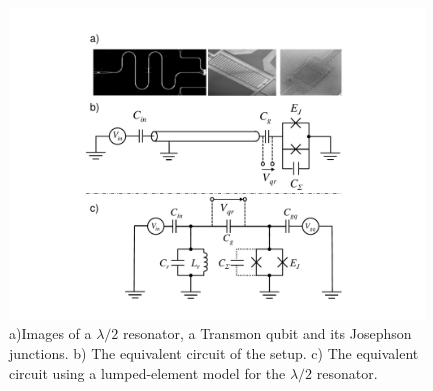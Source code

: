 \begin{figure}
	\includegraphics[width=11cm]{"./material/figures/introduction/cqed/cqed"}
	\caption{a)Images of a $\lambda/2$ resonator, a Transmon qubit and its Josephson junctions. b) The equivalent circuit of the setup. c) The equivalent circuit using a lumped-element model for the $\lambda/2$ resonator.}
	\label{fig:CQED}
\end{figure}


